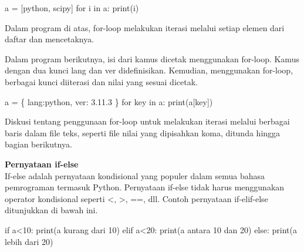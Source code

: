\documentclass[
  letterpaper,
  DIV=11,
  numbers=noendperiod]{scrreprt}
\newenvironment{Shaded}{\begin{snugshade}}{\end{snugshade}}
\newcommand{\BuiltInTok}[1]{\textcolor[rgb]{0.00,0.23,0.31}{#1}}
\newcommand{\ControlFlowTok}[1]{\textcolor[rgb]{0.00,0.23,0.31}{#1}}
\newcommand{\DecValTok}[1]{\textcolor[rgb]{0.68,0.00,0.00}{#1}}
\newcommand{\KeywordTok}[1]{\textcolor[rgb]{0.00,0.23,0.31}{#1}}
\newcommand{\NormalTok}[1]{\textcolor[rgb]{0.00,0.23,0.31}{#1}}
\newcommand{\OperatorTok}[1]{\textcolor[rgb]{0.37,0.37,0.37}{#1}}
\newcommand{\StringTok}[1]{\textcolor[rgb]{0.13,0.47,0.30}{#1}}
\begin{document}
\begin{Shaded}
\begin{Highlighting}[]
\NormalTok{a }\OperatorTok{=}\NormalTok{ [}\StringTok{\textquotesingle{}python\textquotesingle{}}\NormalTok{, }\StringTok{\textquotesingle{}scipy\textquotesingle{}}\NormalTok{] }
\ControlFlowTok{for}\NormalTok{ i }\KeywordTok{in}\NormalTok{ a:}
    \BuiltInTok{print}\NormalTok{(i)}
\end{Highlighting}
\end{Shaded}

Dalam program di atas, for-loop melakukan iterasi melalui setiap elemen
dari daftar dan mencetaknya.

Dalam program berikutnya, isi dari kamus dicetak menggunakan for-loop.
Kamus dengan dua kunci lang dan ver didefinisikan. Kemudian, menggunakan
for-loop, berbagai kunci diiterasi dan nilai yang sesuai dicetak.

\begin{Shaded}
\begin{Highlighting}[]
\NormalTok{a }\OperatorTok{=}\NormalTok{ \{}
\StringTok{\textquotesingle{}lang\textquotesingle{}}\NormalTok{:}\StringTok{\textquotesingle{}python\textquotesingle{}}\NormalTok{,}
\StringTok{\textquotesingle{}ver\textquotesingle{}}\NormalTok{: }\StringTok{\textquotesingle{}3.11.3\textquotesingle{}}
\NormalTok{\}}
\ControlFlowTok{for}\NormalTok{ key }\KeywordTok{in}\NormalTok{ a:}
    \BuiltInTok{print}\NormalTok{(a[key])}
\end{Highlighting}
\end{Shaded}

Diskusi tentang penggunaan for-loop untuk melakukan iterasi melalui
berbagai baris dalam file teks, seperti file nilai yang dipisahkan koma,
ditunda hingga bagian berikutnya.

\textbf{Pernyataan if-else}\\
If-else adalah pernyataan kondisional yang populer dalam semua bahasa
pemrograman termasuk Python. Pernyataan if-else tidak harus menggunakan
operator kondisional seperti \textless, \textgreater, ==, dll. Contoh
pernyataan if-elif-else ditunjukkan di bawah ini.

\begin{Shaded}
\begin{Highlighting}[]
\ControlFlowTok{if}\NormalTok{ a}\OperatorTok{\textless{}}\DecValTok{10}\NormalTok{:}
    \BuiltInTok{print}\NormalTok{(}\StringTok{\textquotesingle{}a kurang dari 10\textquotesingle{}}\NormalTok{)}
\ControlFlowTok{elif}\NormalTok{ a}\OperatorTok{\textless{}}\DecValTok{20}\NormalTok{:}
    \BuiltInTok{print}\NormalTok{(}\StringTok{\textquotesingle{}a antara 10 dan 20\textquotesingle{}}\NormalTok{) }
\ControlFlowTok{else}\NormalTok{:}
    \BuiltInTok{print}\NormalTok{(}\StringTok{\textquotesingle{}a lebih dari 20\textquotesingle{}}\NormalTok{)}
\end{Highlighting}
\end{Shaded}
\end{document}
